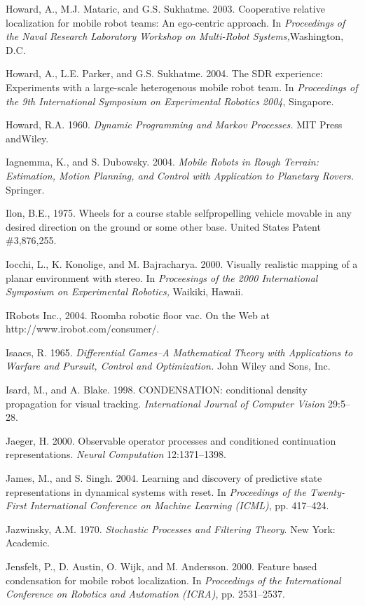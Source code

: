 \documentclass[10pt,a4paper]{article}
\begin{document}
Howard, A., M.J. Mataric, and G.S. Sukhatme. 2003. Cooperative relative localization
for mobile robot teams: An ego-centric approach. In \textit{Proceedings of the Naval
Research Laboratory Workshop on Multi-Robot Systems,}Washington, D.C.

Howard, A., L.E. Parker, and G.S. Sukhatme. 2004. The SDR experience: Experiments
with a large-scale heterogenous mobile robot team. In \textit{Proceedings of the 9th
International Symposium on Experimental Robotics 2004}, Singapore.

Howard, R.A. 1960. \textit{Dynamic Programming and Markov Processes.} MIT Press andWiley.

Iagnemma, K., and S. Dubowsky. 2004. \textit{Mobile Robots in Rough Terrain: Estimation,
Motion Planning, and Control with Application to Planetary Rovers.} Springer.

Ilon, B.E., 1975. Wheels for a course stable selfpropelling vehicle movable in any desired
direction on the ground or some other base. United States Patent \#3,876,255.

Iocchi, L., K. Konolige, and M. Bajracharya. 2000. Visually realistic mapping of a
planar environment with stereo. In \textit{Proceesings of the 2000 International Symposium
on Experimental Robotics,} Waikiki, Hawaii.

IRobots Inc., 2004. Roomba robotic floor vac. On the Web at
http://www.irobot.com/consumer/.

Isaacs, R. 1965. \textit{Differential Games–A Mathematical Theory with Applications to Warfare
and Pursuit, Control and Optimization.} John Wiley and Sons, Inc.

Isard, M., and A. Blake. 1998. CONDENSATION: conditional density propagation
for visual tracking. \textit{International Journal of Computer Vision} 29:5–28.

Jaeger, H. 2000. Observable operator processes and conditioned continuation representations.
\textit{Neural Computation} 12:1371–1398.

James, M., and S. Singh. 2004. Learning and discovery of predictive state representations
in dynamical systems with reset. In \textit{Proceedings of the Twenty-First International
Conference on Machine Learning (ICML)}, pp. 417–424.

Jazwinsky, A.M. 1970. \textit{Stochastic Processes and Filtering Theory}. New York: Academic.

Jensfelt, P., D. Austin, O. Wijk, and M. Andersson. 2000. Feature based condensation
for mobile robot localization. In \textit{Proceedings of the International Conference on Robotics
and Automation (ICRA)}, pp. 2531–2537.
\end{document}
